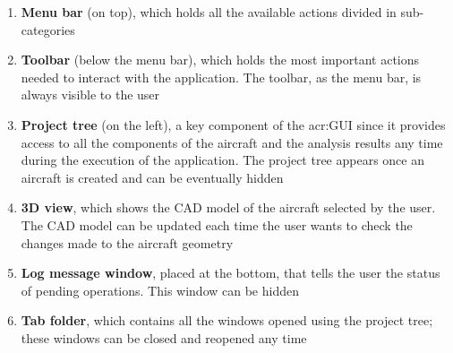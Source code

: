 \begin{enumerate}
	\setlength{\itemsep}{\medspacing}
	\item \textbf{Menu bar} (on top), which holds all the available actions divided in sub-categories
	\item \textbf{Toolbar} (below the menu bar), which holds the most important actions needed to interact with the application. The toolbar, as the menu bar, is always visible to the user
	\item \textbf{Project tree} (on the left), a key component of the \gls{acr:GUI} since it provides access to all the components of the aircraft and the analysis results any time during the execution of the application. The project tree appears once an aircraft is created and can be eventually hidden
	\item \textbf{3D view}, which shows the CAD model of the aircraft selected by the user. The CAD model can be updated each time the user wants to check the changes made to the aircraft geometry
	\item \textbf{Log message window}, placed at the bottom, that tells the user the status of pending operations. This window can be hidden
	\item \textbf{Tab folder}, which contains all the windows opened using the project tree; these windows can be closed and reopened any time
\end{enumerate}
%
